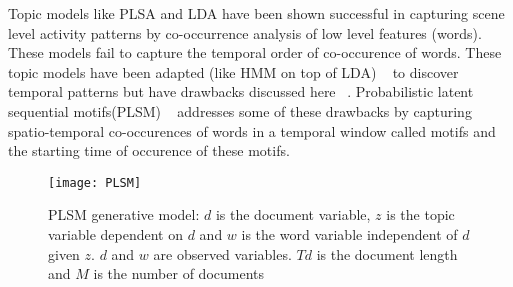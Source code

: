 Topic models like PLSA and LDA have been shown successful in capturing scene level activity patterns by co-occurrence analysis of low level features (words). These models fail to capture the temporal order of co-occurence of words. These topic models have been adapted (like HMM on top of LDA) ~\cite{} to discover temporal patterns but have drawbacks discussed here ~\cite{Varadarajan_IJCV_2012,varadarajan_probabilistic_2010}. Probabilistic latent sequential motifs(PLSM) ~\cite{Varadarajan_IJCV_2012,varadarajan_probabilistic_2010} addresses some of these drawbacks by capturing spatio-temporal co-occurences of words in a temporal window called motifs and the starting time of occurence of these motifs. 

\begin{wrapfigure}{r}{0.30\textwidth}
\label{fig:PLSM}
 \vspace{-20pt}
\begin{center}
\texttt{[image: PLSM]}
\end{center}
 \vspace{-10pt}
 \caption{PLSM generative model: $d$ is the document variable, $z$ is the topic variable dependent on $d$ and $w$ is the word variable independent of $d$ given $z$. $d$ and $w$ are observed variables. $Td$ is the document length and $M$ is the number of documents}
\vspace{-10pt}
\end{wrapfigure}

